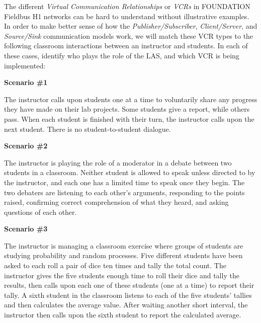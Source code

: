 

The different {\it Virtual Communication Relationships} or {\it VCRs} in FOUNDATION Fieldbus H1 networks can be hard to understand without illustrative examples.  In order to make better sense of how the {\it Publisher/Subscriber}, {\it Client/Server}, and {\it Source/Sink} communication models work, we will match these VCR types to the following classroom interactions between an instructor and students.  In each of these cases, identify who plays the role of the LAS, and which VCR is being implemented:

\vskip 10pt

\noindent
{\bf Scenario \#1}

The instructor calls upon students one at a time to voluntarily share any progress they have made on their lab projects.  Some students give a report, while others pass.  When each student is finished with their turn, the instructor calls upon the next student.  There is no student-to-student dialogue.


\vskip 10pt

\noindent
{\bf Scenario \#2}

The instructor is playing the role of a moderator in a debate between two students in a classroom.  Neither student is allowed to speak unless directed to by the instructor, and each one has a limited time to speak once they begin.  The two debaters are listening to each other's arguments, responding to the points raised, confirming correct comprehension of what they heard, and asking questions of each other.




\vskip 10pt

\noindent
{\bf Scenario \#3}

The instructor is managing a classroom exercise where groups of students are studying probability and random processes.  Five different students have been asked to each roll a pair of dice ten times and tally the total count.  The instructor gives the five students enough time to roll their dice and tally the results, then calls upon each one of these students (one at a time) to report their tally.  A sixth student in the classroom listens to each of the five students' tallies and then calculates the average value.  After waiting another short interval, the instructor then calls upon the sixth student to report the calculated average.



